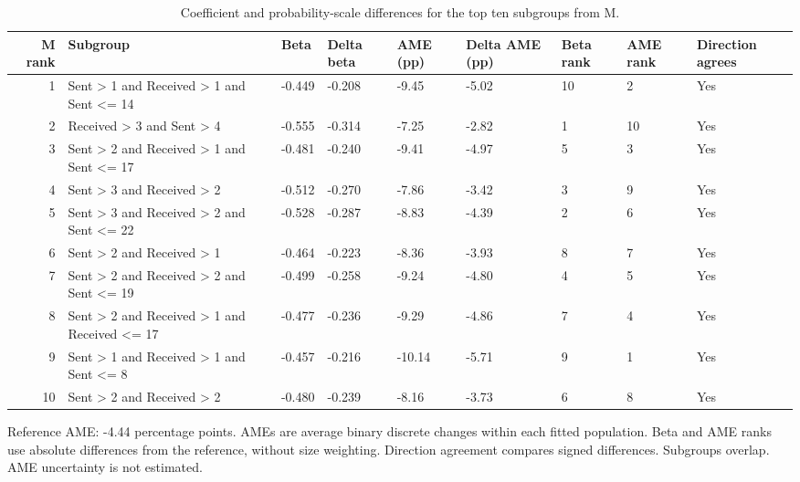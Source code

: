 \begin{table}[t]
\centering
\small
\caption{Coefficient and probability-scale differences for the top ten subgroups from M.}
\label{tab:ame-comparison}
\begin{tabular}{rllllllll}
\toprule
M rank & Subgroup & Beta & Delta beta & AME (pp) & Delta AME (pp) & Beta rank & AME rank & Direction agrees \\
\midrule
1 & Sent > 1 and Received > 1 and Sent <= 14 & -0.449 & -0.208 & -9.45 & -5.02 & 10 & 2 & Yes \\
2 & Received > 3 and Sent > 4 & -0.555 & -0.314 & -7.25 & -2.82 & 1 & 10 & Yes \\
3 & Sent > 2 and Received > 1 and Sent <= 17 & -0.481 & -0.240 & -9.41 & -4.97 & 5 & 3 & Yes \\
4 & Sent > 3 and Received > 2 & -0.512 & -0.270 & -7.86 & -3.42 & 3 & 9 & Yes \\
5 & Sent > 3 and Received > 2 and Sent <= 22 & -0.528 & -0.287 & -8.83 & -4.39 & 2 & 6 & Yes \\
6 & Sent > 2 and Received > 1 & -0.464 & -0.223 & -8.36 & -3.93 & 8 & 7 & Yes \\
7 & Sent > 2 and Received > 2 and Sent <= 19 & -0.499 & -0.258 & -9.24 & -4.80 & 4 & 5 & Yes \\
8 & Sent > 2 and Received > 1 and Received <= 17 & -0.477 & -0.236 & -9.29 & -4.86 & 7 & 4 & Yes \\
9 & Sent > 1 and Received > 1 and Sent <= 8 & -0.457 & -0.216 & -10.14 & -5.71 & 9 & 1 & Yes \\
10 & Sent > 2 and Received > 2 & -0.480 & -0.239 & -8.16 & -3.73 & 6 & 8 & Yes \\
\bottomrule
\end{tabular}
\begin{minipage}{\textwidth}
\footnotesize
Reference AME: -4.44 percentage points. AMEs are average binary discrete changes within each fitted population. Beta and AME ranks use absolute differences from the reference, without size weighting. Direction agreement compares signed differences. Subgroups overlap. AME uncertainty is not estimated.
\end{minipage}
\end{table}
